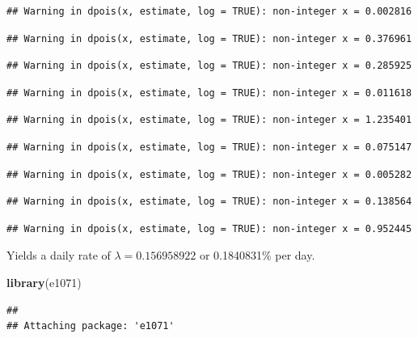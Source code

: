 \documentclass[]{article}
\newenvironment{Shaded}{\begin{snugshade}}{\end{snugshade}}
\newcommand{\KeywordTok}[1]{\textcolor[rgb]{0.13,0.29,0.53}{\textbf{#1}}}
\newcommand{\NormalTok}[1]{#1}
\begin{document}
\begin{verbatim}
## Warning in dpois(x, estimate, log = TRUE): non-integer x = 0.002816
\end{verbatim}

\begin{verbatim}
## Warning in dpois(x, estimate, log = TRUE): non-integer x = 0.376961
\end{verbatim}

\begin{verbatim}
## Warning in dpois(x, estimate, log = TRUE): non-integer x = 0.285925
\end{verbatim}

\begin{verbatim}
## Warning in dpois(x, estimate, log = TRUE): non-integer x = 0.011618
\end{verbatim}

\begin{verbatim}
## Warning in dpois(x, estimate, log = TRUE): non-integer x = 1.235401
\end{verbatim}

\begin{verbatim}
## Warning in dpois(x, estimate, log = TRUE): non-integer x = 0.075147
\end{verbatim}

\begin{verbatim}
## Warning in dpois(x, estimate, log = TRUE): non-integer x = 0.005282
\end{verbatim}

\begin{verbatim}
## Warning in dpois(x, estimate, log = TRUE): non-integer x = 0.138564
\end{verbatim}

\begin{verbatim}
## Warning in dpois(x, estimate, log = TRUE): non-integer x = 0.952445
\end{verbatim}

Yields a daily rate of \(\lambda = 0.156958922\) or 0.1840831\% per
day.\medskip

\begin{Shaded}
\begin{Highlighting}[]
\KeywordTok{library}\NormalTok{(e1071)}
\end{Highlighting}
\end{Shaded}

\begin{verbatim}
## 
## Attaching package: 'e1071'
\end{verbatim}
\end{document}
